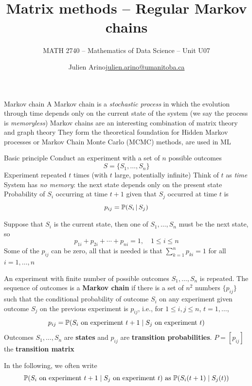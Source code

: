 \documentclass[aspectratio=169]{beamer}\usepackage[]{graphicx}\usepackage[]{xcolor}
\subtitle{MATH 2740 -- Mathematics of Data Science -- Unit U07}
\author{\texorpdfstring{Julien Arino\newline\url{julien.arino@umanitoba.ca}}{Julien Arino}}
\institute{Department of Mathematics @ University of Manitoba}
\title{Matrix methods -- Regular Markov chains}
\begin{document}
\setcounter{theorem}{89}

\SStitlepage
\SSoutlinepage





\begin{frame}{Markov chain}
	A Markov chain is a \emph{stochastic process} in which the evolution through time depends only on the current state of the system (we say the process is \emph{memoryless})
	\vfill
	Markov chains are an interesting combination of matrix theory and graph theory
	\vfill
	They form the theoretical foundation for Hidden Markov processes or Markov Chain Monte Carlo (MCMC) methods, are used in ML
\end{frame}



\begin{frame}{Basic principle}
Conduct an experiment with a set of $n$ possible outcomes
\[
S=\{S_1,\dots, S_n\}
\]
\vfill
Experiment repeated $t$ times (with $t$ large, potentially infinite)
\vfill
Think of $t$ as \emph{time}
\vfill 
System has \emph{no memory}: the next state depends only on the present state
\vfill
Probability of $S_i$ occurring at time $t+1$ given that $S_j$ occurred at time $t$ is
\[
p_{ij}=\mathbb{P}(S_i\,|\,S_j)
\]
\end{frame}


\begin{frame} 
Suppose that $S_i$ is the current state, then one of $S_1, \ldots,S_n$ must be the next state, so
\[
p_{1i}+p_{2i}+\cdots+p_{ni}=1, \quad 1\leq i\leq n
\]
\vfill
Some of the $p_{ij}$ can be zero, all that is needed is that $\sum_{k=1}^n p_{ki}=1$ for all $i=1,\ldots,n$
\end{frame}

\begin{frame}
\begin{definition}
An experiment with finite number of possible outcomes $S_1,\ldots,S_n$ is repeated. The sequence of outcomes is a \textbf{Markov chain} if there is a set of $n^2$ numbers $\{p_{ij}\}$ such that the conditional probability of outcome $S_i$ on any experiment given outcome $S_j$ on the previous experiment is $p_{ij}$, i.e., for $1\leq i,j\leq n$, $t=1,\ldots$,
\[
	p_{ij}=\mathbb{P}(S_i\textrm{ on experiment }t+1\;|\;
	S_j\textrm{ on experiment }t)	
\]
Outcomes $S_1,\ldots,S_n$ are \textbf{states} and $p_{ij}$ are \textbf{transition probabilities}. $P=[p_{ij}]$ the \textbf{transition matrix}
\end{definition}
\vfill
In the following, we often write
\[
\mathbb{P}(S_i\textrm{ on experiment }t+1\;|\;
	S_j\textrm{ on experiment }t)	\text{ as }\mathbb{P}(S_i(t+1)\;|\;S_j(t))
\]
\end{frame}
\end{document}
